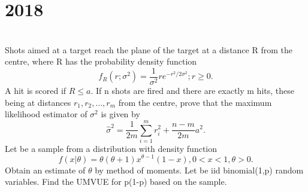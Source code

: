 \section*{2018}
\vspace{-.5cm}
\hrulefill \smallskip\\
 Shots aimed at a target reach the plane of the target at a distance R from the centre, where R has the probability density function
\[ f_R(r;\sigma^2) = \dfrac{1}{\sigma^2}re^{-r^2/2\sigma^2};r\geq 0. \] A hit is scored if $R \leq a$. If n shots are fired and there are exactly m hits, these being at distances $r_1,r_2,\ldots,r_m$ from the centre, prove that the maximum likelihood estimator of $\sigma^2$ is given by 
\[ \hat{\sigma}^2 = \dfrac{1}{2m}\sum_{i =1}^{m}r_i^2 + \dfrac{n-m}{2m}a^2.\]
\myline
{} Let \Xton be a sample from  a distribution with density function \[f(x|\theta) = \theta(\theta+1)x^{\theta-1}(1 -x), 0 < x < 1, \theta>0. \] Obtain an estimate of $\theta$ by method of moments.
\myline
{} Let \Xton be iid binomial(1,p) random variables. Find the UMVUE for p(1-p) based on the sample.
